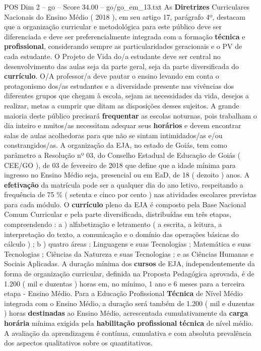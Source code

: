 \begin{textsample}{POS Dim 2 – go – Score 34.00 – go/go\_em\_13.txt}
As \textbf{Diretrizes} Curriculares Nacionais do Ensino Médio ( 2018 ), em seu artigo 17, parágrafo 4º, destacam que a organização curricular e metodológica para este público deve ser diferenciada e deve ser preferencialmente integrada com a formação \textbf{técnica} e \textbf{profissional}, considerando sempre as particularidades geracionais e o PV de cada estudante.
O Projeto de Vida do/a estudante deve ser central no desenvolvimento das aulas seja da parte geral, seja da parte diversificada do \textbf{currículo}.
O/A professor/a deve pautar o ensino levando em conta o protagonismo dos/as estudantes e a diversidade presente nas vivências dos diferentes grupos que chegam à escola, sejam as necessidades da vida, desejos a realizar, metas a cumprir que ditam as disposições desses sujeitos.
A grande maioria deste público precisará \textbf{frequentar} as escolas noturnas, pois trabalham o dia inteiro e muitos/as necessitam adequar seus \textbf{horários} e devem encontrar salas de aulas acolhedoras para que não se sintam intimidados/as e/ou constrangidos/as.
A organização da EJA, no estado de Goiás, tem como parâmetro a Resolução nº 03, do Conselho Estadual de Educação de Goiás ( CEE/GO ), de 03 de fevereiro de 2018 que define que a idade mínima para ingresso no Ensino Médio seja, presencial ou em EaD, de 18 ( dezoito ) anos.
A \textbf{efetivação} da matrícula pode ser a qualquer dia do ano letivo, respeitando a frequência de 75 \% ( setenta e cinco por cento ) nas atividades escolares previstas para cada módulo.
O \textbf{currículo} pleno da EJA é composto pela Base Nacional Comum Curricular e pela parte diversificada, distribuídas em três etapas, compreendendo : a ) alfabetização e letramento ( a escrita, a leitura, a interpretação do texto, a comunicação e o domínio das operações básicas do cálculo ) ; b ) quatro áreas : Linguagens e suas Tecnologias ; Matemática e suas Tecnologias ; Ciências da Natureza e suas Tecnologias ; e as Ciências Humanas e Sociais Aplicadas.
A duração mínima dos \textbf{cursos} de EJA, independentemente da forma de organização curricular, definida na Proposta Pedagógica aprovada, é de 1.200 ( mil e duzentas ) horas em, no mínimo, 1 ano e 6 meses para a terceira etapa - Ensino Médio.
Para a Educação Profissional \textbf{Técnica} de Nível Médio integrada com o Ensino Médio, a duração será também de 1.200 ( mil e duzentas ) horas \textbf{destinadas} ao Ensino Médio, acrescentada cumulativamente da \textbf{carga} \textbf{horária} mínima exigida pela \textbf{habilitação} \textbf{profissional} \textbf{técnica} de nível médio.
A avaliação da aprendizagem é contínua, cumulativa e com absoluta prevalência dos aspectos qualitativos sobre os quantitativos.

\end{textsample}
